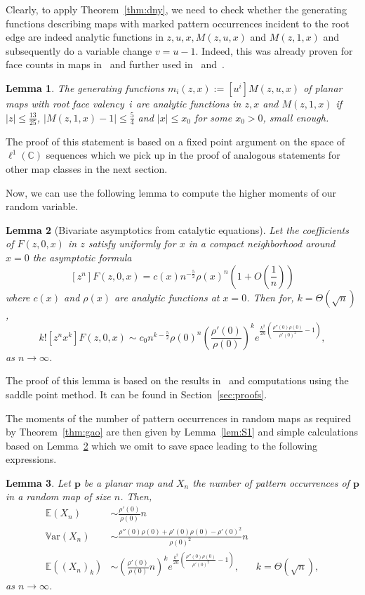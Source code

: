 \documentclass[reqno, 11pt]{amsart}
\newtheorem{lemma}{Lemma}
\theoremstyle{definition}
\theoremstyle{remark}
\newcommand{\C}{\mathbb{C}}
\newcommand{\E}{\mathbb{E}}
\newcommand{\V}{{\mathbb{V}\mbox{ar}}}
\newcommand{\map}[1]{\textbf{#1}}
\numberwithin{equation}{section}
\begin{document}
Clearly, to apply Theorem~\ref{thm:dny}, we need to check whether the generating functions describing maps with marked pattern occurrences incident to the root edge are indeed analytic functions in $z,u,x,M(z,u,x)$ and $M(z,1,x)$ and subsequently do a variable change $v=u-1$. Indeed, this was already proven for face counts in maps in~\cite{DrPa} and further used in~\cite{Yu} and~\cite{patternocc}. 

\begin{lemma}\label{lem:mov_bi}
	The generating functions $m_i(z,x):= [u^i]M(z,u,x)$ of planar maps with root face valency~$i$ are analytic functions in $z,x$ and $M(z,1,x)$ if $|z|\leq \frac{13}{25}$, $|M(z,1,x)-1| \leq \frac{5}{4}$ and $|x| \leq x_0$ for some $x_0>0$, small enough.
\end{lemma}

The proof of this statement is based on a fixed point argument on the space of $\ell^1(\C)$ sequences which we pick up in the proof of analogous statements for other map classes in the next section.

Now, we can use the following lemma to compute the higher moments of our random variable. 

\begin{lemma}[Bivariate asymptotics from catalytic equations]\label{lem:bivar}
    Let the coefficients of $F(z,0,x)$ in $z$ satisfy uniformly for $x$ in a compact neighborhood around $x=0$ the asymptotic formula
    \[
        [z^n]F(z,0,x) = c(x)n^{-\frac{5}{2}}\rho(x)^n\left(1+O\left(\frac{1}{n}\right)\right)
    \]
    where $c(x)$ and $\rho(x)$ are analytic functions at $x=0$. Then for, $k = \Theta(\sqrt{n})$,
    \[
        k![z^nx^k]F(z,0,x) \sim c_0n^{k-\frac{5}{2}}\rho(0)^n\left(\frac{\rho'(0)}{\rho(0)}\right)^ke^{\frac{k^2}{2n}\left(\frac{\rho''(0)\rho(0)}{\rho'(0)^2}-1\right)},
    \]
    as $n\rightarrow \infty$.
\end{lemma}

The proof of this lemma is based on the results in~\cite{DrmotaNoyYu} and computations using the saddle point method. It can be found in Section~\ref{sec:proofs}.

The moments of the number of pattern occurrences in random maps as required by Theorem~\ref{thm:gao} are then given by Lemma~\ref{lem:S1} and simple calculations based on Lemma~\ref{lem:bivar} which we omit to save space leading to the following expressions.

\begin{lemma}\label{lem:moments}
    Let $\map{p}$ be a planar map and $X_n$ the number of pattern occurrences of $\map{p}$ in a random map of size $n$. Then,
    \begin{align*}
        \E(X_n)&\sim \frac{\rho'(0)}{\rho(0)}n\\
        \V(X_n)&\sim \frac{\rho''(0)\rho(0)+\rho'(0)\rho(0)-\rho'(0)^2}{\rho(0)^2}n\\
        \E((X_n)_k)&\sim \left(\frac{\rho'(0)}{\rho(0)}n\right)^{k}e^{\frac{k^2}{2n}\left(\frac{\rho''(0)\rho(0)}{\rho'(0)^2}-1\right)}, &k = \Theta(\sqrt{n}),
    \end{align*}
    as $n \rightarrow \infty$.
\end{lemma}
\end{document}

